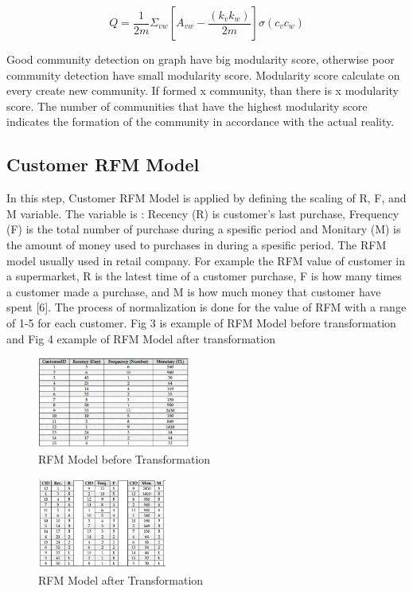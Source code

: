 \documentclass[conference]{IEEEtran}
\begin{document}
\begin{equation}
	\label{eq:modularity_GN}
    Q = \frac{1}{2m} \Sigma_{vw} [A_{vw} - \frac{(k_{v}k_{w})}{2m}] \sigma(c_{v}c_{w})
\end{equation}

Good community detection on graph have big modularity score, otherwise poor community detection have small modularity score. Modularity score calculate on every create new community. If formed x community, than there is x modularity score. The number of communities that have the highest modularity score indicates the formation of the community in accordance with the actual reality.


\subsection{Customer RFM Model}
In this step, Customer RFM Model is applied by defining the scaling of R, F, and M variable. The
variable is : Recency (R) is customer's last purchase,
Frequency (F) is the total number of purchase during a spesific
period and Monitary (M) is the amount of money used to
purchases in during a spesific period. The RFM model usually
used in retail company. For example the RFM value of
customer in a supermarket, R is the latest time of a customer
purchase, F is how many times a customer made a purchase, and M is how much money that customer have spent [6]. The process of normalization is done for the value of RFM with a range of 1-5 for each customer. Fig 3 is example of RFM Model before transformation and Fig 4 example of RFM Model after transformation

\begin{figure}[h]
\centering
\includegraphics[width=\columnwidth, height=3cm,keepaspectratio]{figure/rfm_model}
\caption{RFM Model before Transformation}
\label{rfm_model}
\end{figure}

\begin{figure}[h]
\centering
\includegraphics[width=\columnwidth, height=3cm,keepaspectratio]{figure/rfm_model_after}
\caption{RFM Model after Transformation}
\label{rfm_model_after}
\end{figure}
\end{document}
